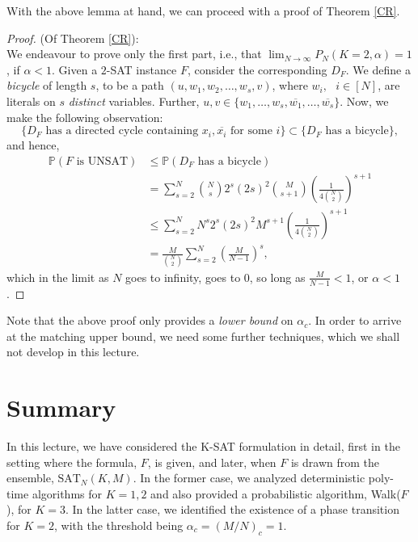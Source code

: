 \documentclass[letterpaper,english,11pt]{article}
\begin{document}
With the above lemma at hand, we can proceed with a proof of Theorem \ref{CR}.
\begin{proof}
(Of Theorem \ref{CR}):\\
We endeavour to prove only the first part, i.e., that $\lim_{N\rightarrow \infty}P_N(K=2,\alpha)=1$, if $\alpha<1$.
Given a $2$-SAT instance $F$, consider the corresponding $D_F$. We define a \textit{bicycle} of length $s$, to be a path $(u,w_1,w_2,\ldots,w_s,v)$, where $w_i,\text{ }i\in [N]$, are literals on $s$ \textit{distinct} variables. Further, $u,v\in\{w_1,\ldots,w_s,\overline{w_1},\ldots,\overline{w_s}\}$. Now, we make the following observation:
\begin{equation*}
    \{D_F\text{ has a directed cycle containing }x_i,\overline{x_i}\text{ for some }i\}\subset \{D_F\text{ has a bicycle}\},
\end{equation*}
and hence,
\begin{align*}
\mathbb{P}(F\text{ is UNSAT})&\leq \mathbb{P}(D_F\text{ has a bicycle})\\
&=\sum_{s=2}^{N}{N\choose s}2^{s}(2s)^{2}{M\choose s+1}\left(\frac{1}{4{N\choose 2}}\right)^{s+1}\\
&\leq \sum_{s=2}^{N}N^{s}2^{s}(2s)^{2}M^{s+1}\left(\frac{1}{4{N\choose 2}}\right)^{s+1}\\
&=\frac{M}{{N\choose 2}}\sum_{s=2}^{N}\left(\frac{M}{N-1}\right)^{s},
\end{align*}
which in the limit as $N$ goes to infinity, goes to $0$, so long as $\frac{M}{N-1}<1$, or $\alpha<1$.
\end{proof}
\begin{rem}
Note that the above proof only provides a \textit{lower bound} on $\alpha_c$. In order to arrive at the matching upper bound, we need some further techniques, which we shall not develop in this lecture.
\end{rem}
\section{Summary}
In this lecture, we have considered the K-SAT formulation in detail, first in the setting where the formula, $F$, is given, and later, when $F$ is drawn from the ensemble, $\text{SAT}_N(K,M)$. In the former case, we analyzed deterministic poly-time algorithms for $K=1,2$ and also provided a probabilistic algorithm, Walk($F$), for $K=3$. In the latter case, we identified the existence of a phase transition for $K=2$, with the threshold being $\alpha_c=(M/N)_c=1$.
\end{document}
